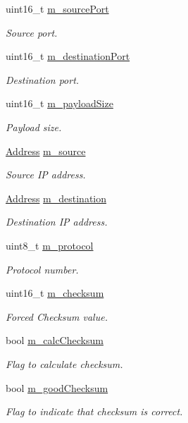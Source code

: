 \begin{DoxyCompactItemize}
\item 
uint16\+\_\+t \hyperlink{classns3_1_1UdpHeader_aa773b19b0bfe6a9eadfb49165065af40}{m\+\_\+source\+Port}
\begin{DoxyCompactList}\small\item\em Source port. \end{DoxyCompactList}\item 
uint16\+\_\+t \hyperlink{classns3_1_1UdpHeader_a4c7f437d51670b52805f67116648f792}{m\+\_\+destination\+Port}
\begin{DoxyCompactList}\small\item\em Destination port. \end{DoxyCompactList}\item 
uint16\+\_\+t \hyperlink{classns3_1_1UdpHeader_a733e8f1bd11c7238eca3d3686690dae1}{m\+\_\+payload\+Size}
\begin{DoxyCompactList}\small\item\em Payload size. \end{DoxyCompactList}\item 
\hyperlink{classns3_1_1Address}{Address} \hyperlink{classns3_1_1UdpHeader_a66f5c7867ba9da25c94a4c947f4e9e6c}{m\+\_\+source}
\begin{DoxyCompactList}\small\item\em Source IP address. \end{DoxyCompactList}\item 
\hyperlink{classns3_1_1Address}{Address} \hyperlink{classns3_1_1UdpHeader_a262f3acd93ce4d1917917b2c1020e129}{m\+\_\+destination}
\begin{DoxyCompactList}\small\item\em Destination IP address. \end{DoxyCompactList}\item 
uint8\+\_\+t \hyperlink{classns3_1_1UdpHeader_a3c0ee9daf179e535e52bf6537b8bb095}{m\+\_\+protocol}
\begin{DoxyCompactList}\small\item\em Protocol number. \end{DoxyCompactList}\item 
uint16\+\_\+t \hyperlink{classns3_1_1UdpHeader_ad498526e1d270564d0a439bff1cc4877}{m\+\_\+checksum}
\begin{DoxyCompactList}\small\item\em Forced Checksum value. \end{DoxyCompactList}\item 
bool \hyperlink{classns3_1_1UdpHeader_ab183811507f758b062c57e6a67cb1e29}{m\+\_\+calc\+Checksum}
\begin{DoxyCompactList}\small\item\em Flag to calculate checksum. \end{DoxyCompactList}\item 
bool \hyperlink{classns3_1_1UdpHeader_ae4b6b68adf297aa0822d9f8a841d9a4a}{m\+\_\+good\+Checksum}
\begin{DoxyCompactList}\small\item\em Flag to indicate that checksum is correct. \end{DoxyCompactList}\end{DoxyCompactItemize}
